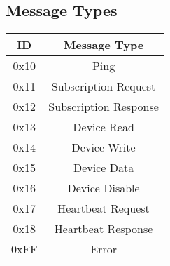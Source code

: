 \documentclass[12pt]{book}
\begin{document}
\subsection{Message Types}
\begin{center}
    \begin{tabular}{|c|c|}
        \hline
        ID & Message Type \\
        \hline
        0x10 & Ping \\
        0x11 & Subscription Request \\
        0x12 & Subscription Response \\
        0x13 & Device Read \\
        0x14 & Device Write \\
        0x15 & Device Data \\
        0x16 & Device Disable \\
        0x17 & Heartbeat Request \\
        0x18 & Heartbeat Response \\
        0xFF & Error \\
        \hline
    \end{tabular}
\end{center}
\end{document}
